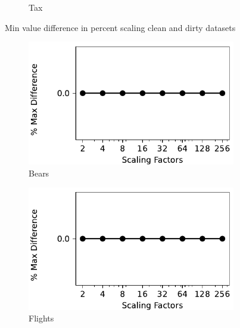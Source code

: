 \begin{figure}[!ht]
\begin{subfigure}{0.32\textwidth}
    \caption{Tax}
    \label{exp:min_tax}
\end{subfigure}
\hfill
\caption{Min value difference in percent scaling clean and dirty datasets}
\label{exp:min_difference_datasets}
\end{figure}



\begin{figure}[!ht]
    \centering 
    \centering
\begin{subfigure}{0.32\textwidth}
    \includegraphics[width=\textwidth]{figures/plot/max/max_diff_beers.pdf}
    \caption{Bears}
    \label{exp:max_bears}
\end{subfigure}
\hfill
\begin{subfigure}{0.32\textwidth}
    \includegraphics[width=\textwidth]{figures/plot/max/max_diff_flights.pdf}
    \caption{Flights}
    \label{exp:max_flights}
\end{subfigure}
\hfill
\begin{subfigure}{0.32\textwidth}

\end{subfigure}
\end{figure}
